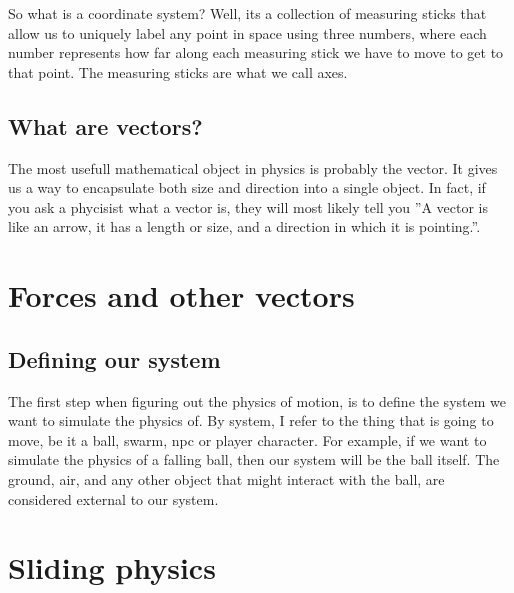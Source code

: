 \documentclass[%
notitlepage,
 amsmath,amssymb,
 aps,
]{revtex4-2}  %
\begin{document}
So what is a coordinate system? Well, its a collection of measuring sticks that allow us to uniquely label any point in space using three numbers, where each number represents how far along each measuring stick we have to move to get to that point. The measuring sticks are what we call axes.

\subsection{What are vectors?} \label{sec:Maths:subsec:WhatVectors}
The most usefull mathematical object in physics is probably the vector. It gives us a way to encapsulate both size and direction into a single object. In fact, if you ask a phycisist what a vector is, they will most likely tell you ''A vector is like an arrow, it has a length or size, and a direction in which it is pointing.''.

\section{Forces and other vectors} \label{sec:ForcesAndVecs}
\subsection{Defining our system} \label{sec:ForcesAndVecs:subsec:DefSys}
The first step when figuring out the physics of motion, is to define the system we want to simulate the physics of. By system, I refer to the thing that is going to move, be it a ball, swarm, npc or player character. For example, if we want to simulate the physics of a falling ball, then our system will be the ball itself. The ground, air, and any other object that might interact with the ball, are considered external to our system.

\section{Sliding physics} \label{sec:Sliding}
\end{document}
